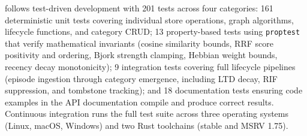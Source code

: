 \alaya{} follows test-driven development with 201 tests across four
categories: 161 deterministic unit tests covering individual store
operations, graph algorithms, lifecycle functions, and category CRUD;
13 property-based tests using \texttt{proptest} that verify mathematical
invariants (cosine similarity bounds, RRF score positivity and ordering,
Bjork strength clamping, Hebbian weight bounds, recency decay monotonicity);
9 integration tests covering full lifecycle pipelines (episode ingestion
through category emergence, including LTD decay, RIF suppression, and
tombstone tracking); and 18 documentation tests ensuring code examples in
the API documentation compile and produce correct results. Continuous
integration runs the full test suite across three operating systems (Linux,
macOS, Windows) and two Rust toolchains (stable and MSRV 1.75).
